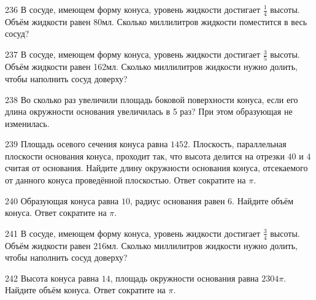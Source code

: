 \documentclass[a4paper]{article}
\begin{document}
\begin{taskBN}{236}
В сосуде, имеющем форму конуса, уровень жидкости достигает $\frac{1}{4}$ высоты. Объём жидкости равен 80мл. Сколько миллилитров жидкости поместится в весь сосуд?
\end{taskBN}

\begin{taskBN}{237}
В сосуде, имеющем форму конуса, уровень жидкости достигает $\frac{3}{5}$ высоты. Объём жидкости равен 162мл. Сколько миллилитров жидкости нужно долить, чтобы наполнить сосуд доверху?
\end{taskBN}

\begin{taskBN}{238}
Во сколько раз увеличили площадь боковой поверхности конуса, если его длина окружности основания увеличилась в 5 раз? При этом образующая не изменилась.
\end{taskBN}

\begin{taskBN}{239}
Площадь осевого сечения конуса равна $1452$. Плоскость, параллельная плоскости основания конуса,  проходит так, что высота делится на отрезки $40$ и $4$ считая от основания. Найдите длину окружности основания конуса, отсекаемого от данного конуса проведённой плоскостью. Ответ сократите на $\pi$.
\end{taskBN}

\begin{taskBN}{240}
Образующая конуса равна $10$, радиус основания равен $6$. Найдите объём конуса. Ответ сократите на $\pi$.
\end{taskBN}

\begin{taskBN}{241}
В сосуде, имеющем форму конуса, уровень жидкости достигает $\frac{3}{4}$ высоты. Объём жидкости равен 216мл. Сколько миллилитров жидкости нужно долить, чтобы наполнить сосуд доверху?
\end{taskBN}

\begin{taskBN}{242}
Высота конуса равна $14$, площадь окружности основания равна $2304\pi$. Найдите объём конуса. Ответ сократите на $\pi$.
\end{taskBN}
\end{document}
